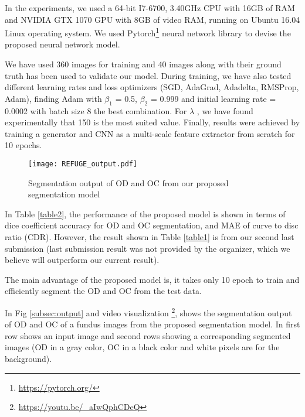 \documentclass[runningheads,a4paper]{llncs}
\begin{document}
In the experiments, we used a 64-bit I7-6700, 3.40GHz CPU with 16GB of RAM and NVIDIA GTX 1070 GPU with 8GB of video RAM, running on Ubuntu 16.04 Linux operating system. We used Pytorch\footnote{\url{https://pytorch.org/}} neural network library to devise the proposed neural network model.

We have used 360 images for training and 40 images along with their ground truth has been used to validate our model. During training, we have also tested different learning rates and loss optimizers (SGD, AdaGrad, Adadelta, RMSProp, Adam), finding Adam with $\beta_1$ = 0.5, $\beta_2$ = 0.999 and initial learning rate = 0.0002 with batch size 8 the best combination. For $\lambda$ , we have found experimentally that 150 is the most suited value. Finally, results were achieved by training a generator and CNN as a multi-scale feature extractor from scratch for 10 epochs.

\label{subsec:output}
\begin{figure*}[htp]
\centering
\texttt{[image: REFUGE\_output.pdf]}
\caption{Segmentation output of OD and OC from our proposed segmentation model}
\label{fig:cGAN architecture}
\end{figure*}

In Table \ref{table2}, the performance of the proposed model is shown in terms of dice coefficient accuracy for OD and OC segmentation, and MAE of curve to disc ratio (CDR). However, the result shown in Table \ref{table1} is from our second last submission (last submission result was not provided by the organizer, which we believe will outperform our current result). 

The main advantage of the proposed model is, it takes only 10 epoch to train and efficiently segment the OD and OC from the test data.

In Fig \ref{subsec:output} and video visualization \footnote{\url{https://youtu.be/_aIwQphCDeQ}}, shows the segmentation output of OD and OC of a fundus images from the proposed segmentation model. In first row shows an input image and second rows showing a corresponding segmented images (OD in a gray color, OC in a black color and white pixels are for the background).
\begin{table}[htp]
\centering
\caption{Optic Disc and Cup segmentation Dice coefficient accuracy and MAE CDR  with the REFUGE challenge dataset of 400 validation images}
\label{table2}
\end{table}
\end{document}
